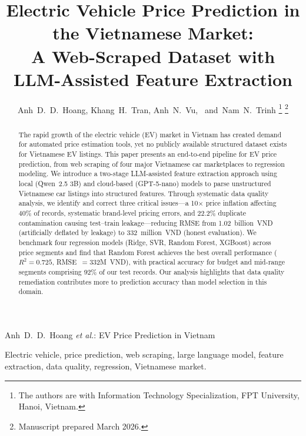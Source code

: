 \documentclass[lettersize,journal]{IEEEtran}
\begin{document}
\title{Electric Vehicle Price Prediction in the Vietnamese Market:\\ A Web-Scraped Dataset with LLM-Assisted Feature Extraction}

\author{Anh~D.~D.~Hoang, Khang~H.~Tran, Anh~N.~Vu, ~and~Nam~N.~Trinh
\thanks{The authors are with Information Technology Specialization, FPT University, Hanoi, Vietnam.}
\thanks{Manuscript prepared March 2026.}}

%
{Anh~D.~D.~Hoang \MakeLowercase{\textit{et al.}}: EV Price Prediction in Vietnam}

\maketitle

\begin{abstract}
The rapid growth of the electric vehicle (EV) market in Vietnam has created
demand for automated price estimation tools, yet no publicly available
structured dataset exists for Vietnamese EV listings. This paper presents an
end-to-end pipeline for EV price prediction, from web scraping of four major
Vietnamese car marketplaces to regression modeling. We introduce a two-stage
LLM-assisted feature extraction approach using local (Qwen~2.5 3B) and
cloud-based (GPT-5-nano) models to parse unstructured Vietnamese car listings
into structured features. Through systematic data quality analysis, we
identify and correct three critical issues---a 10$\times$ price inflation
affecting 40\% of records, systematic brand-level pricing errors, and 22.2\%
duplicate contamination causing test--train leakage---reducing RMSE from
1.02~billion~VND (artificially deflated by leakage) to 332~million~VND
(honest evaluation). We benchmark four regression models (Ridge, SVR, Random
Forest, XGBoost) across price segments and find that Random Forest achieves
the best overall performance ($R^2 = 0.725$, RMSE~$= 332$M~VND), with
practical accuracy for budget and mid-range segments comprising 92\% of
our test records. Our analysis highlights that data quality remediation contributes
more to prediction accuracy than model selection in this domain.
\end{abstract}

\begin{IEEEkeywords}
Electric vehicle, price prediction, web scraping, large language model,
feature extraction, data quality, regression, Vietnamese market.
\end{IEEEkeywords}
\end{document}

